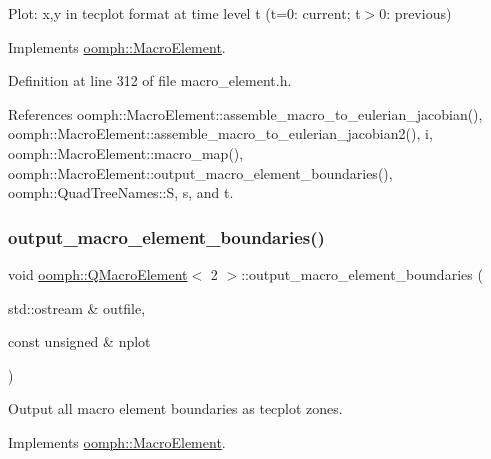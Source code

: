 Plot\+: x,y in tecplot format at time level t (t=0\+: current; t$>$0\+: previous) 



Implements \hyperlink{classoomph_1_1MacroElement_a5d3646716d60aedf456889768a3c2dbe}{oomph\+::\+Macro\+Element}.



Definition at line 312 of file macro\+\_\+element.\+h.



References oomph\+::\+Macro\+Element\+::assemble\+\_\+macro\+\_\+to\+\_\+eulerian\+\_\+jacobian(), oomph\+::\+Macro\+Element\+::assemble\+\_\+macro\+\_\+to\+\_\+eulerian\+\_\+jacobian2(), i, oomph\+::\+Macro\+Element\+::macro\+\_\+map(), oomph\+::\+Macro\+Element\+::output\+\_\+macro\+\_\+element\+\_\+boundaries(), oomph\+::\+Quad\+Tree\+Names\+::S, s, and t.

\mbox{\label{classoomph_1_1QMacroElement_3_012_01_4_ae717a0b0098f830a1b1a5019ce5431a8}} 
\subsubsection{\texorpdfstring{output\+\_\+macro\+\_\+element\+\_\+boundaries()}{output\_macro\_element\_boundaries()}}
{\footnotesize\ttfamily void \hyperlink{classoomph_1_1QMacroElement}{oomph\+::\+Q\+Macro\+Element}$<$ 2 $>$\+::output\+\_\+macro\+\_\+element\+\_\+boundaries (\begin{DoxyParamCaption}\item[{std\+::ostream \&}]{outfile,  }\item[{const unsigned \&}]{nplot }\end{DoxyParamCaption})\hspace{0.3cm}{\ttfamily [virtual]}}



Output all macro element boundaries as tecplot zones. 



Implements \hyperlink{classoomph_1_1MacroElement_a748b561313e952c9767d278d0e99be4e}{oomph\+::\+Macro\+Element}.



